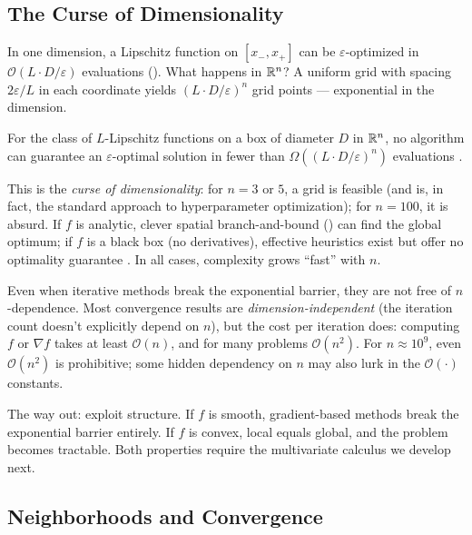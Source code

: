 \subsection{The Curse of Dimensionality}\label{ssec:curse-dim}

In one dimension, a Lipschitz function on $[x_-, x_+]$ can be $\varepsilon$-optimized in $\mathcal{O}(L \cdot D/\varepsilon)$ evaluations ().
What happens in $\mathbb{R}^n$?
A uniform grid with spacing $2\varepsilon/L$ in each coordinate yields $(L\cdot D/\varepsilon)^n$ grid points --- exponential in the dimension.

\begin{thm}\label{thm:multivariate-lip}
	For the class of $L$-Lipschitz functions on a box of diameter $D$ in $\mathbb{R}^n$, no algorithm can guarantee an $\varepsilon$-optimal solution in fewer than $\Omega((L \cdot D / \varepsilon)^n)$ evaluations \cite{hansen1995}.
\end{thm}

This is the \textit{curse of dimensionality}: for $n = 3$ or $5$, a grid is feasible (and is, in fact, the standard approach to hyperparameter optimization); for $n = 100$, it is absurd.
If $f$ is analytic, clever spatial branch-and-bound () can find the global optimum; if $f$ is a black box (no derivatives), effective heuristics exist but offer no optimality guarantee \cite{serafino2014}.
In all cases, complexity grows ``fast'' with $n$.

Even when iterative methods break the exponential barrier, they are not free of $n$-dependence.
Most convergence results are \textit{dimension-independent} (the iteration count doesn't explicitly depend on $n$), but the cost per iteration does: computing $f$ or $\nabla f$ takes at least $\mathcal{O}(n)$, and for many problems $\mathcal{O}(n^2)$.
For $n \approx 10^9$, even $\mathcal{O}(n^2)$ is prohibitive; some hidden dependency on $n$ may also lurk in the $\mathcal{O}(\cdot)$ constants.

The way out: exploit structure.
If $f$ is smooth, gradient-based methods break the exponential barrier entirely.
If $f$ is convex, local equals global, and the problem becomes tractable.
Both properties require the multivariate calculus we develop next.


\subsection{Neighborhoods and Convergence}\label{ssec:convergence}

